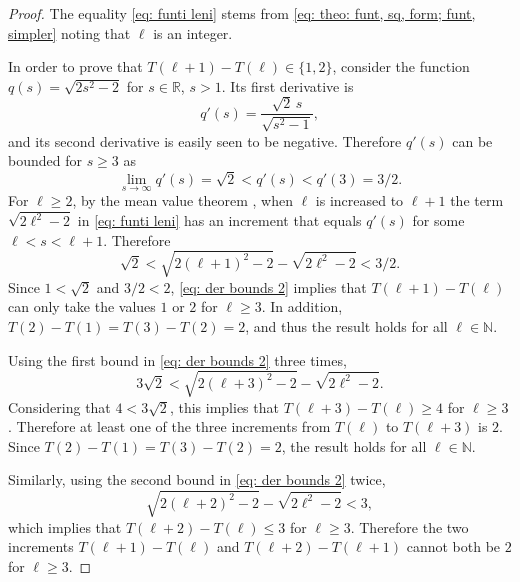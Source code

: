 \documentclass[12pt, a4paper]{article}
\newcommand{\funti}{T} %
\newcommand{\len}{\ell} %
\newcommand{\leni}{\ell} %
\newcommand{\genfun}{q}
\newcommand{\genvar}{s}
\begin{document}
\begin{proof}
The equality \eqref{eq: funti leni} stems from \eqref{eq: theo: funt, sq, form; funt, simpler} noting that $\len$ is an integer.

In order to prove that $\funti(\leni+1)-\funti(\leni) \in \{1,2\}$, consider the function $\genfun(\genvar) = \sqrt{2\genvar^2-2}$ for $\genvar \in \mathbb R$, $\genvar>1$. Its first derivative is
\begin{equation}
\genfun'(\genvar) = \frac {\sqrt{2} \, \genvar} {\sqrt{\genvar^2-1}},
\end{equation}
and its second derivative is easily seen to be negative. Therefore $\genfun'(\genvar)$ can be bounded for $\genvar \geq 3$ as
\begin{equation}
\label{eq: der bounds}
\lim_{\genvar \rightarrow \infty} \genfun'(\genvar) = \sqrt{2} < \genfun'(\genvar) < \genfun'(3) = 3/2.
\end{equation}
For $\leni \geq 2$, by the mean value theorem \cite[section~5.3]{Abbott15}, when $\leni$ is increased to $\leni+1$ the term $\sqrt{2\leni^2-2}$ in \eqref{eq: funti leni} has an increment that equals $\genfun'(\genvar)$ for some $\leni < \genvar < \leni+1$. Therefore
\begin{equation}
\label{eq: der bounds 2}
\sqrt{2} < \sqrt{2(\leni+1)^2-2} - \sqrt{2\leni^2-2} < 3/2.
\end{equation}
Since $1 < \sqrt{2}$ and $3/2 < 2$, \eqref{eq: der bounds 2} implies that $\funti(\leni+1)-\funti(\leni)$ can only take the values $1$ or $2$ for $\leni \geq 3$. In addition, $\funti(2)-\funti(1) = \funti(3)-\funti(2) = 2$, and thus the result holds for all $\leni \in \mathbb N$.

Using the first bound in \eqref{eq: der bounds 2} three times,
\begin{equation}
3\sqrt{2} < \sqrt{2(\leni+3)^2-2} - \sqrt{2\leni^2-2}.
\end{equation}
Considering that $4 < 3\sqrt{2}$, this implies that $\funti(\leni+3)-\funti(\leni) \geq 4$ for $\leni \geq 3$. Therefore at least one of the three increments from $\funti(\leni)$ to $\funti(\leni+3)$ is $2$. Since $\funti(2)-\funti(1) = \funti(3)-\funti(2) = 2$, the result holds for all $\leni \in \mathbb N$.

Similarly, using the second bound in \eqref{eq: der bounds 2} twice,
\begin{equation}
\sqrt{2(\leni+2)^2-2} - \sqrt{2\leni^2-2} < 3,
\end{equation}
which implies that $\funti(\leni+2)-\funti(\leni) \leq 3$ for $\leni \geq 3$. Therefore the two increments $\funti(\leni+1)-\funti(\leni)$ and $\funti(\leni+2)-\funti(\leni+1)$ cannot both be $2$ for $\leni \geq 3$.
\end{proof}
\end{document}

